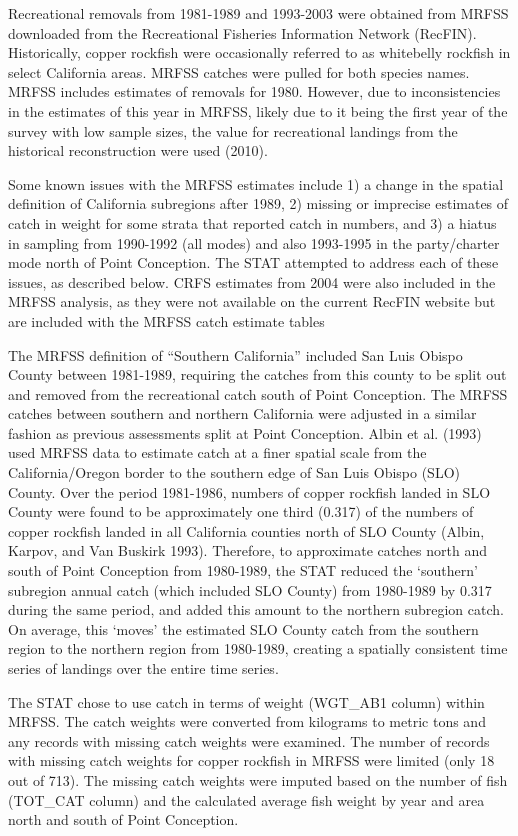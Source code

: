 \documentclass[11pt,
  english,
  letterpaper,
]{article}
\begin{document}
Recreational removals from 1981-1989 and 1993-2003 were obtained from MRFSS downloaded from the Recreational Fisheries Information Network (RecFIN). Historically, copper rockfish were occasionally referred to as whitebelly rockfish in select California areas. MRFSS catches were pulled for both species names. MRFSS includes estimates of removals for 1980. However, due to inconsistencies in the estimates of this year in MRFSS, likely due to it being the first year of the survey with low sample sizes, the value for recreational landings from the historical reconstruction were used (2010).

Some known issues with the MRFSS estimates include 1) a change in the spatial definition of California subregions after 1989, 2) missing or imprecise estimates of catch in weight for some strata that reported catch in numbers, and 3) a hiatus in sampling from 1990-1992 (all modes) and also 1993-1995 in the party/charter mode north of Point Conception. The STAT attempted to address each of these issues, as described below. CRFS estimates from 2004 were also included in the MRFSS analysis, as they were not available on the current RecFIN website but are included with the MRFSS catch estimate tables

The MRFSS definition of ``Southern California'' included San Luis Obispo County between 1981-1989, requiring the catches from this county to be split out and removed from the recreational catch south of Point Conception. The MRFSS catches between southern and northern California were adjusted in a similar fashion as previous assessments split at Point Conception. Albin et al. (1993) used MRFSS data to estimate catch at a finer spatial scale from the California/Oregon border to the southern edge of San Luis Obispo (SLO) County. Over the period 1981-1986, numbers of copper rockfish landed in SLO County were found to be approximately one third (0.317) of the numbers of copper rockfish landed in all California counties north of SLO County (Albin, Karpov, and Van Buskirk 1993). Therefore, to approximate catches north and south of Point Conception from 1980-1989, the STAT reduced the `southern' subregion annual catch (which included SLO County) from 1980-1989 by 0.317 during the same period, and added this amount to the northern subregion catch. On average, this `moves' the estimated SLO County catch from the southern region to the northern region from 1980-1989, creating a spatially consistent time series of landings over the entire time series.

The STAT chose to use catch in terms of weight (WGT\_AB1 column) within MRFSS. The catch weights were converted from kilograms to metric tons and any records with missing catch weights were examined. The number of records with missing catch weights for copper rockfish in MRFSS were limited (only 18 out of 713). The missing catch weights were imputed based on the number of fish (TOT\_CAT column) and the calculated average fish weight by year and area north and south of Point Conception.
\end{document}
